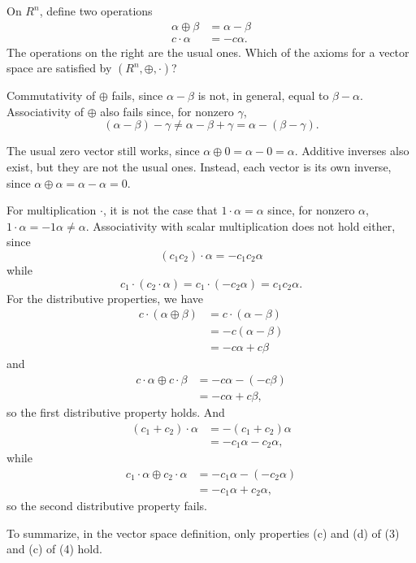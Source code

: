  On $R^n$, define two operations
\begin{align*}
  \alpha \oplus \beta &= \alpha - \beta \\
  c\cdot\alpha &= -c\alpha.
\end{align*}
The operations on the right are the usual ones. Which of the axioms
for a vector space are satisfied by $(R^n,\oplus,\cdot)$?
\begin{solution}
  Commutativity of $\oplus$ fails, since $\alpha - \beta$ is not, in
  general, equal to $\beta - \alpha$. Associativity of $\oplus$ also
  fails since, for nonzero $\gamma$,
  \begin{equation*}
    (\alpha - \beta) - \gamma
    \neq \alpha - \beta + \gamma
    = \alpha - (\beta - \gamma).
  \end{equation*}

  The usual zero vector still works, since
  $\alpha\oplus0 = \alpha - 0 = \alpha$. Additive inverses also exist,
  but they are not the usual ones. Instead, each vector is its own
  inverse, since $\alpha\oplus\alpha = \alpha - \alpha = 0$.

  For multiplication $\cdot$, it is not the case that
  $1\cdot\alpha = \alpha$ since, for nonzero $\alpha$,
  $1\cdot\alpha = -1\alpha \neq \alpha$. Associativity with scalar
  multiplication does not hold either, since
  \begin{equation*}
    (c_1c_2)\cdot\alpha
    = -c_1c_2\alpha
  \end{equation*}
  while
  \begin{equation*}
    c_1\cdot(c_2\cdot\alpha)
    = c_1\cdot(-c_2\alpha)
    = c_1c_2\alpha.
  \end{equation*}
  For the distributive properties, we have
  \begin{align*}
    c\cdot(\alpha\oplus\beta)
    &= c\cdot(\alpha - \beta) \\
    &= -c(\alpha - \beta) \\
    &= -c\alpha + c\beta
  \end{align*}
  and
  \begin{align*}
    c\cdot\alpha\oplus c\cdot\beta
    &= -c\alpha - (-c\beta) \\
    &= -c\alpha + c\beta,
  \end{align*}
  so the first distributive property holds. And
  \begin{align*}
    (c_1 + c_2)\cdot\alpha
    &= -(c_1 + c_2)\alpha \\
    &= -c_1\alpha - c_2\alpha,
  \end{align*}
  while
  \begin{align*}
    c_1\cdot\alpha \oplus c_2\cdot\alpha
    &= -c_1\alpha - (-c_2\alpha) \\
    &= -c_1\alpha + c_2\alpha,
  \end{align*}
  so the second distributive property fails.

  To summarize, in the vector space definition, only properties (c)
  and (d) of (3) and (c) of (4) hold.
\end{solution}

